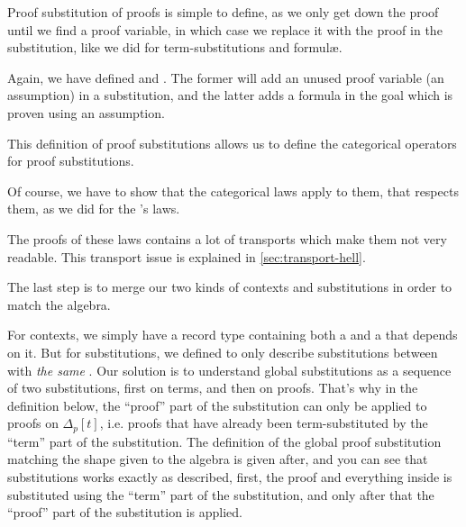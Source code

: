 \documentclass[10pt,a4paper]{article}
\begin{document}
			Proof substitution of proofs is simple to define, as we only get down the proof until we find a proof variable, in which case we replace it with the proof in the substitution, like we did for term-substitutions and formulæ.
			
			Again, we have defined  and . The former will add an unused proof variable (an assumption) in a substitution, and the latter adds a formula in the goal which is proven using an assumption.
		
			\begin{tcolorbox}
			\end{tcolorbox}
		
			This definition of proof substitutions allows us to define the categorical operators for proof substitutions. 
		
			Of course, we have to show that the categorical laws apply to them, that  respects them, as we did for the 's laws.
			
			The proofs of these laws contains a lot of transports which make them not very readable. This transport issue is explained in \autoref{sec:transport-hell}.
			
			\begin{tcolorbox}
				\agda{agda/FFOL-I-27.tex}
			\end{tcolorbox}
		
			The last step is to merge our two kinds of contexts and substitutions in order to match the algebra.
			
			For contexts, we simply have a record type containing both a  and a  that depends on it. But for substitutions, we defined  to only describe substitutions between  with \emph{the same }. Our solution is to understand global substitutions as a sequence of two substitutions, first on terms, and then on proofs. That's why in the definition below, the \enquote{proof} part of the substitution can only be applied to proofs on $\Delta_p [t]$, i.e. proofs that have already been term-substituted by the \enquote{term} part of the substitution. The definition of the global proof substitution matching the shape given to the algebra is given after, and you can see that substitutions works exactly as described, first, the proof and everything inside is substituted using the \enquote{term} part of the substitution, and only after that the \enquote{proof} part of the substitution is applied.
		
\end{document}
